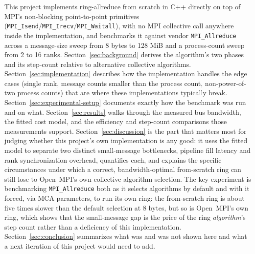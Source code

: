 This project implements ring-allreduce from scratch in C++ directly on top of MPI's non-blocking point-to-point primitives (\texttt{MPI\_Isend}/\texttt{MPI\_Irecv}/\texttt{MPI\_Waitall}), with no MPI collective call anywhere inside the implementation, and benchmarks it against vendor \texttt{MPI\_Allreduce} across a message-size sweep from 8 bytes to 128 MiB and a process-count sweep from 2 to 16 ranks. Section~\ref{sec:background} derives the algorithm's two phases and its step-count relative to alternative collective algorithms. Section~\ref{sec:implementation} describes how the implementation handles the edge cases (single rank, message counts smaller than the process count, non-power-of-two process counts) that are where these implementations typically break. Section~\ref{sec:experimental-setup} documents exactly how the benchmark was run and on what. Section~\ref{sec:results} walks through the measured bus bandwidth, the fitted cost model, and the efficiency and step-count comparisons those measurements support. Section~\ref{sec:discussion} is the part that matters most for judging whether this project's own implementation is any good: it uses the fitted model to separate two distinct small-message bottlenecks, pipeline fill latency and rank synchronization overhead, quantifies each, and explains the specific circumstances under which a correct, bandwidth-optimal from-scratch ring can still lose to Open~MPI's own collective algorithm selection. The key experiment is benchmarking \texttt{MPI\_Allreduce} both as it selects algorithms by default and with it forced, via MCA parameters, to run its own ring: the from-scratch ring is about five times slower than the default selection at 8 bytes, but so is Open~MPI's own ring, which shows that the small-message gap is the price of the ring \emph{algorithm}'s step count rather than a deficiency of this implementation. Section~\ref{sec:conclusion} summarizes what was and was not shown here and what a next iteration of this project would need to add.
